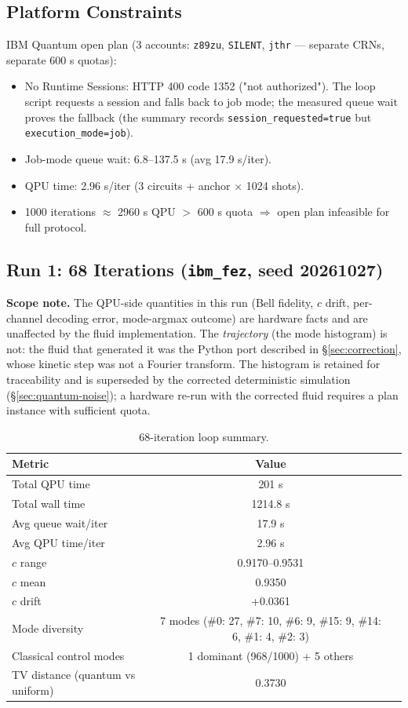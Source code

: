 \documentclass[sigconf,anonymous=false]{acmart}
\begin{document}
\subsection{Platform Constraints}

IBM Quantum open plan (3 accounts: \texttt{z89zu}, \texttt{SILENT}, \texttt{jthr} --- separate CRNs, separate 600 s quotas):
\begin{itemize}
\item No Runtime Sessions: HTTP 400 code 1352 ("not authorized"). The loop script requests a session and falls back to job mode; the measured queue wait proves the fallback (the summary records \texttt{session\_requested=true} but \texttt{execution\_mode=job}).
\item Job-mode queue wait: 6.8--137.5 s (avg 17.9 s/iter).
\item QPU time: 2.96 s/iter (3 circuits + anchor $\times$ 1024 shots).
\item 1000 iterations $\approx$ 2960 s QPU $>$ 600 s quota $\Rightarrow$ open plan infeasible for full protocol.
\end{itemize}

\subsection{Run 1: 68 Iterations (\texttt{ibm\_fez}, seed 20261027)}

\textbf{Scope note.} The QPU-side quantities in this run (Bell fidelity, $c$ drift, per-channel
decoding error, mode-argmax outcome) are hardware facts and are unaffected by the fluid
implementation. The \emph{trajectory} (the mode histogram) is not: the fluid that generated it was
the Python port described in \S\ref{sec:correction}, whose kinetic step was not a Fourier
transform. The histogram is retained for traceability and is superseded by the corrected
deterministic simulation (\S\ref{sec:quantum-noise}); a hardware re-run with the corrected fluid
requires a plan instance with sufficient quota.

\begin{table}[h]
\centering
\caption{68-iteration loop summary.}
\label{tab:loop68}
\begin{tabular}{lcc}
\toprule
Metric & Value \\
\midrule
Total QPU time & 201 s \\
Total wall time & 1214.8 s \\
Avg queue wait/iter & 17.9 s \\
Avg QPU time/iter & 2.96 s \\
$c$ range & 0.9170--0.9531 \\
$c$ mean & 0.9350 \\
$c$ drift & +0.0361 \\
Mode diversity & 7 modes (\#0: 27, \#7: 10, \#6: 9, \#15: 9, \#14: 6, \#1: 4, \#2: 3) \\
Classical control modes & 1 dominant (968/1000) + 5 others \\
TV distance (quantum vs uniform) & 0.3730 \\
\bottomrule
\end{tabular}
\end{table}
\end{document}
